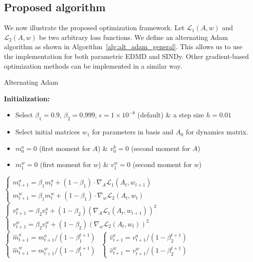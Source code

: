 \documentclass
[
    a4paper,
    DIV=11,
    abstract=true,
    11pt,
]
{scrartcl}
\theoremstyle{definition}
\begin{document}
\subsection{Proposed algorithm}

We now illustrate the proposed optimization framework. Let $\mathcal{L}_1(A, w)$ and $\mathcal{L}_2(A, w)$ be two arbitrary loss functions. We define an alternating Adam algorithm as shown in Algorithm~\ref{alg:alt_adam_general}. This allows us to use the implementation for both parametric EDMD and SINDy. Other gradient-based optimization methods can be implemented in a similar way.

\begin{algorithm}[h!]
\caption{Alternating Adam}
\begin{algorithmic}
\State \textbf{Initialization:}
\begin{itemize}
 \item Select $\beta_1 = 0.9$, $\beta_2=0.999$, $\epsilon=1 \times 10^{-8}$ (default) \& a step size $h=0.01$
 \item Select initial matrices $w_{1}$ for parameters in basis and $A_0$ for dynamics matrix.
 \item $m^a_0 = 0$ (first moment for $A$) \& $v^k_0 = 0$ (second moment for $A$)
 \item $m^w_1 = 0$ (first moment for $w$) \& $v^w_1 = 0$ (second moment for $w$)
 \end{itemize}
\State $\left\{
\begin{array}{l}
m^a_{t+1} = \beta_1 m^a_t + (1-\beta_1) \cdot \nabla_A \mathcal{L}_1(A_{t}, w_{t+1}) \\
m^w_{t+1} = \beta_1 m^w_t + (1-\beta_1) \cdot \nabla_w \mathcal{L}_2(A_t, w_{t})
\end{array}
\right. $ 
\State $\left\{
\begin{array}{l}
v^a_{t+1} = \beta_2 v^a_t + (1-\beta_2) (\nabla_A \mathcal{L}_1(A_{t}, w_{t+1}))^2 \\
v^w_{t+1} = \beta_2 v^w_t + (1-\beta_2) (\nabla_w \mathcal{L}_2(A_t, w_{t}))^2
\end{array}
\right. $ 
\State $ \left\{ \begin{array}{l}
\hat{m}_{t+1}^a = m^a_{t+1}/(1 - \beta_1^{t+1}) \\
\hat{m}_{t+1}^w = m^w_{t+1}/(1 - \beta_1^{t+1})
\end{array} \right. $ 
\State $ \left\{
\begin{array}{l}
\hat{v}_{t+1}^a = v^a_{t+1}/(1 - \beta_2^{t+1}) \\
\hat{v}_{t+1}^w = v^w_{t+1}/(1 - \beta_2^{t+1})
\end{array} \right. $ 


\end{algorithmic}
\end{algorithm}
\end{document}
